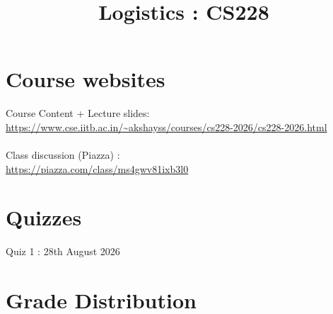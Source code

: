 \documentclass{article}
\title{Logistics : CS228}
\date{}
\begin{document}
\maketitle


\section{Course websites}
Course Content + Lecture slides: \\\url{https://www.cse.iitb.ac.in/~akshayss/courses/cs228-2026/cs228-2026.html}
\\\\
Class discussion (Piazza) : \\\url{https://piazza.com/class/ms4gwv81ixb3l0}
\section{Quizzes}
        Quiz 1 : 28th August 2026
\pagebreak
\section{Grade Distribution}
\end{document}

